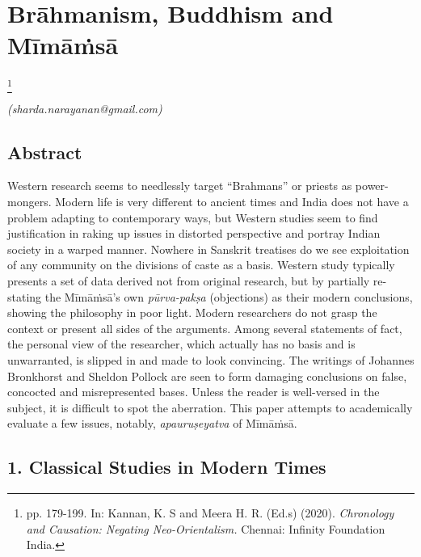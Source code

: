 
\chapter{Brāhmanism, Buddhism and Mīmāṁsā}\label{chapter6}

\footnote{pp. 179-199. In: Kannan, K. S and Meera H. R. (Ed.s) (2020). \textit{Chronology and Causation: Negating Neo-Orientalism.} Chennai: Infinity Foundation India.}

\begin{flushright}
\textit{(sharda.narayanan@gmail.com)}
\end{flushright}


\vspace{.2cm}

\section*{Abstract}

Western research seems to needlessly target “Brahmans” or priests as power-mongers. Modern life is very different to ancient times and India does not have a problem adapting to contemporary ways, but Western studies seem to find justification in raking up issues in distorted perspective and portray Indian society in a warped manner. Nowhere in Sanskrit treatises do we see exploitation of any community on the divisions of caste as a basis. Western study typically presents a set of data derived not from original research, but by partially re-stating the Mīmāṁsā’s own \textit{pūrva-pakṣa} (objections) as their modern conclusions, showing the philosophy in poor light. Modern researchers do not grasp the context or present all sides of the arguments. Among several statements of fact, the personal view of the researcher, which actually has no basis and is unwarranted, is slipped in and made to look convincing. The writings of Johannes Bronkhorst and Sheldon Pollock are seen to form damaging conclusions on false, concocted and misrepresented bases. Unless the reader is well-versed in the subject, it is difficult to spot the aberration. This paper attempts to academically evaluate a few issues, notably, \textit{apauruṣeyatva} of Mīmāṁsā.

\vspace{-.3cm}

\section*{1. Classical Studies in Modern Times}

